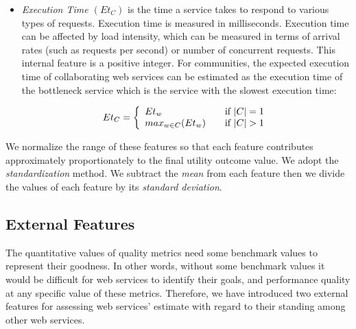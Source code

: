 \begin{itemize}
	\item \emph{Execution Time $(Et_{C})$} is the time a service takes to respond to various types of requests.
	Execution time is measured in milliseconds. Execution time can be affected by load intensity, which can be measured in terms of arrival rates (such as requests per second) or number of concurrent requests. This internal feature is a positive integer. For communities, the expected execution time of collaborating web services can be estimated as the execution time of the bottleneck service which is the service with the slowest execution time:
	
	\begin{equation}
		Et_{C} = \left\{
			\begin{array}{l l}
				Et_{w} & \quad \text{if $|C| = 1$}\\
				max_{w \in C}{(Et_{w})} & \quad \text{if $|C| > 1$}
			\end{array} \right.
	\end{equation}
	
\end{itemize}


	We normalize the range of these features so that each feature contributes approximately proportionately to the final utility outcome value. We adopt the \emph{standardization} method. We subtract the \emph{mean} from each feature then we divide the values of each feature by its \emph{standard deviation}.


\subsection{External Features}\label{s:ef}

The quantitative values of quality metrics need some benchmark values to represent their goodness. In other words, without some benchmark values it would be difficult for web services to identify their goals, and performance quality at any specific value of these metrics. Therefore, we have introduced two external features for assessing web services' estimate with regard to their standing among other web services.

